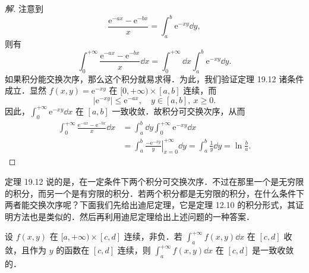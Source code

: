 \begin{proof}[解]
注意到
\[
\frac{\mathrm{e}^{-ax}-\mathrm{e}^{-bx}}{x}=\int_{a}^{b}\mathrm{e}^{-xy}\dd y,
\]
则有
\[
\int_{0}^{+\infty}\frac{\mathrm{e}^{-ax}-\mathrm{e}^{-bx}}{x}\dd x=\int_{0}^{+\infty}\dd x\int_{a}^{b}\mathrm{e}^{-xy}\dd y.
\]
如果积分能交换次序，那么这个积分就易求得．为此，我们验证定理 19.12 诸条件成立．显然 $f(x,y)=\mathrm{e}^{-xy}$ 在 $[0,+\infty)\times[a,b]$ 连续，而
\[
\left|\mathrm{e}^{-xy}\right|\leqslant\mathrm{e}^{-ax},\quad y\in[a,b],\ x\geqslant 0.
\]
因此，$\displaystyle\int_{0}^{+\infty}\mathrm{e}^{-xy}\dd x$ 在 $[a,b]$ 一致收敛．故积分可交换次序，从而
\[
\begin{aligned}
\int_{0}^{+\infty}\frac{\mathrm{e}^{-ax}-\mathrm{e}^{-bx}}{x}\dd x&=\int_{a}^{b}\dd y\int_{0}^{+\infty}\mathrm{e}^{-xy}\dd x\\
&=\int_{a}^{b}\left.\frac{-\mathrm{e}^{-xy}}{y}\right|_{x=0}^{+\infty}\dd y=\int_{a}^{b}\frac{1}{y}\dd y=\ln\frac{b}{a}.
\end{aligned}
\]
\end{proof}

定理 19.12 说的是，在一定条件下两个积分可交换次序．不过在那里一个是无穷限的积分，而另一个是有穷限的积分．若两个积分都是无穷限的积分，在什么条件下两者能交换次序呢？下面我们先给出迪尼定理，它是定理 12.10 的积分形式，其证明方法也是类似的．然后再利用迪尼定理给出上述问题的一种答案．

\begin{theorem}[迪尼定理]\label{thm:19-14}
设 $f(x,y)$ 在 $[a,+\infty)\times[c,d]$ 连续，非负．若 $\displaystyle\int_{a}^{+\infty}f(x,y)\dd x$ 在 $[c,d]$ 收敛，且作为 $y$ 的函数在 $[c,d]$ 连续，则 $\displaystyle\int_{a}^{+\infty}f(x,y)\dd x$ 在 $[c,d]$ 是一致收敛的．
\end{theorem}

